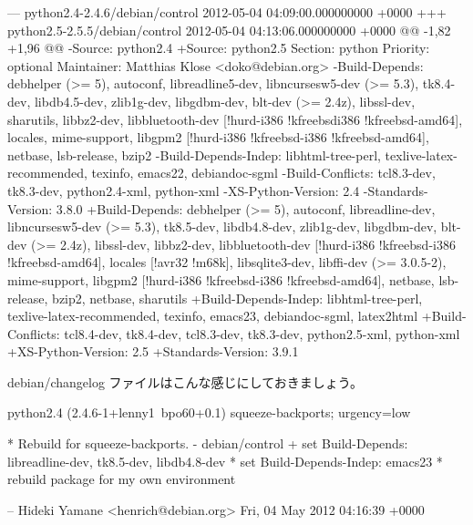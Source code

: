 \documentclass[mingoth,a4paper]{jsarticle}
\begin{document}
\begin{commandline}
--- python2.4-2.4.6/debian/control	2012-05-04 04:09:00.000000000 +0000
+++ python2.5-2.5.5/debian/control	2012-05-04 04:13:06.000000000 +0000
@@ -1,82 +1,96 @@
-Source: python2.4
+Source: python2.5
 Section: python
 Priority: optional
 Maintainer: Matthias Klose <doko@debian.org>
-Build-Depends: debhelper (>= 5), autoconf, libreadline5-dev, libncursesw5-dev (>= 5.3), tk8.4-dev, libdb4.5-dev, zlib1g-dev,
libgdbm-dev, blt-dev (>= 2.4z), libssl-dev, sharutils, libbz2-dev, libbluetooth-dev [!hurd-i386 !kfreebsdi386
!kfreebsd-amd64], locales, mime-support, libgpm2 [!hurd-i386 !kfreebsd-i386 !kfreebsd-amd64], netbase, lsb-release, bzip2
-Build-Depends-Indep: libhtml-tree-perl, texlive-latex-recommended, texinfo, emacs22, debiandoc-sgml
-Build-Conflicts: tcl8.3-dev, tk8.3-dev, python2.4-xml, python-xml
-XS-Python-Version: 2.4
-Standards-Version: 3.8.0
+Build-Depends: debhelper (>= 5), autoconf, libreadline-dev, libncursesw5-dev (>= 5.3), tk8.5-dev, libdb4.8-dev, zlib1g-dev,
libgdbm-dev, blt-dev (>= 2.4z), libssl-dev, libbz2-dev, libbluetooth-dev [!hurd-i386 !kfreebsd-i386 !kfreebsd-amd64],
locales [!avr32 !m68k], libsqlite3-dev, libffi-dev (>= 3.0.5-2), mime-support, libgpm2 [!hurd-i386 !kfreebsd-i386
 !kfreebsd-amd64], netbase, lsb-release, bzip2, netbase, sharutils
+Build-Depends-Indep: libhtml-tree-perl, texlive-latex-recommended, texinfo, emacs23, debiandoc-sgml, latex2html
+Build-Conflicts: tcl8.4-dev, tk8.4-dev, tcl8.3-dev, tk8.3-dev, python2.5-xml, python-xml
+XS-Python-Version: 2.5
+Standards-Version: 3.9.1
\end{commandline}

debian/changelog ファイルはこんな感じにしておきましょう。

\begin{commandline}
python2.4 (2.4.6-1+lenny1~bpo60+0.1) squeeze-backports; urgency=low

  * Rebuild for squeeze-backports.
    - debian/control
     + set Build-Depends: libreadline-dev, tk8.5-dev, libdb4.8-dev
     * set Build-Depends-Indep: emacs23
  * rebuild package for my own environment

 -- Hideki Yamane <henrich@debian.org>  Fri, 04 May 2012 04:16:39 +0000
\end{commandline}

\end{document}
